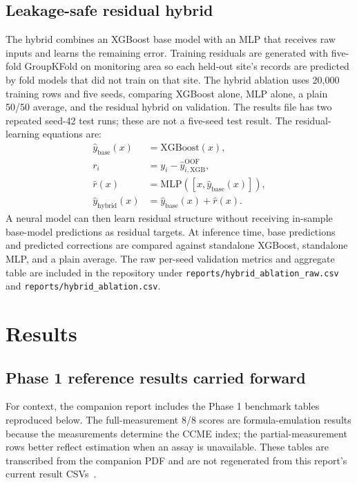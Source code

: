 \documentclass[conference]{IEEEtran}
\begin{document}
\subsection{Leakage-safe residual hybrid}
The hybrid combines an XGBoost base model with an MLP that receives raw inputs and learns the remaining error. Training residuals are generated with five-fold GroupKFold on monitoring area so each held-out site's records are predicted by fold models that did not train on that site. The hybrid ablation uses 20,000 training rows and five seeds, comparing XGBoost alone, MLP alone, a plain 50/50 average, and the residual hybrid on validation. The results file has two repeated seed-42 test runs; these are not a five-seed test result. The residual-learning equations are:
\begin{align}
 \hat y_{\mathrm{base}}(x) &= \mathrm{XGBoost}(x),\\
 r_i &= y_i - \hat y^{\mathrm{OOF}}_{i,\mathrm{XGB}},\\
 \hat r(x) &= \mathrm{MLP}\!\left([x,\hat y_{\mathrm{base}}(x)]\right),\\
 \hat y_{\mathrm{hybrid}}(x) &= \hat y_{\mathrm{base}}(x)+\hat r(x).
\end{align}
A neural model can then learn residual structure without receiving in-sample base-model predictions as residual targets. At inference time, base predictions and predicted corrections are compared against standalone XGBoost, standalone MLP, and a plain average. The raw per-seed validation metrics and aggregate table are included in the repository under \texttt{reports/hybrid\_ablation\_raw.csv} and \texttt{reports/hybrid\_ablation.csv}.

\section{Results}
\label{sec:results}
\subsection{Phase 1 reference results carried forward}
For context, the companion report includes the Phase 1 benchmark tables reproduced below. The full-measurement 8/8 scores are formula-emulation results because the measurements determine the CCME index; the partial-measurement rows better reflect estimation when an assay is unavailable. These tables are transcribed from the companion PDF and are not regenerated from this report's current result CSVs~\cite{phase2companion}.
\end{document}
